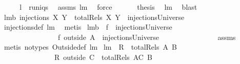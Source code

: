 \begin{isabellebody}
\ \ \isamarkupfalse%
\ \isamarkupfalse%
\ {\isachardoublequoteopen}{\isacharquery}l\ {\isasymsubseteq}\ runiqs{\isachardoublequoteclose}\ \isamarkupfalse%
\ assms{\isacharparenleft}{}{\isacharcomma}{}{\isacharparenright}\ lm{}{}\ \isamarkupfalse%
\ force\ \isanewline
\ \ \isamarkupfalse%
\ \isamarkupfalse%
\ {\isacharquery}thesis\ \isamarkupfalse%
\ lm{}{}\ \isamarkupfalse%
\ blast\isanewline
{}\isamarkupfalse%
%
\endisatagproof
{\isafoldproof}%
%
\isadelimproof
\isanewline
%
\endisadelimproof
\isanewline
{}\isamarkupfalse%
\ lm{}{}b{\isacharcolon}\ {\isachardoublequoteopen}injections\ X\ Y\ {\isacharequal}\ totalRels\ X\ Y\ {\isasyminter}\ injectionsUniverse{\isachardoublequoteclose}\ \isanewline
%
\isadelimproof
\ \ \ \ \ \ \ \ \ \ \ \ \ %
\endisadelimproof
%
\isatagproof
{}\isamarkupfalse%
\ injections{\isacharunderscore}def\ lm{}{}\ \isamarkupfalse%
\ metis%
\endisatagproof
{\isafoldproof}%
%
\isadelimproof
\isanewline
%
\endisadelimproof
\isanewline
{}\isamarkupfalse%
\ lm{}{}b{\isacharcolon}\ \ {\isachardoublequoteopen}f\ {\isasymin}\ injectionsUniverse{\isachardoublequoteclose}\ \isanewline
\ \ \ \ \ \ \ \ \ \ \ \ \ \ \ \ {\isachardoublequoteopen}f\ outside\ A\ {\isasymin}\ injectionsUniverse{\isachardoublequoteclose}\ \isanewline
%
\isadelimproof
\ \ \ \ \ \ \ \ \ \ \ \ \ %
\endisadelimproof
%
\isatagproof
{}\isamarkupfalse%
\ assms\ \isamarkupfalse%
\ {\isacharparenleft}metis\ {\isacharparenleft}no{\isacharunderscore}types{\isacharparenright}\ Outside{\isacharunderscore}def\ lm{}{}{\isacharparenright}%
\endisatagproof
{\isafoldproof}%
%
\isadelimproof
\isanewline
%
\endisadelimproof
\isanewline
{}\isamarkupfalse%
\ lm{}{}{\isacharcolon}\ \ {\isachardoublequoteopen}R\ {\isasymin}\ totalRels\ A\ B{\isachardoublequoteclose}\ \isanewline
\ \ \ \ \ \ \ \ \ \ \ \ \ \ \ {\isachardoublequoteopen}R\ outside\ C\ {\isasymin}\ totalRels\ {\isacharparenleft}A{\isacharminus}C{\isacharparenright}\ B{\isachardoublequoteclose}\ \isanewline
%
\isadelimproof
\ \ \ \ \ \ \ \ \ \ \ \ %
\endisadelimproof
%
\isatagproof
{}\isamarkupfalse%

\end{isabellebody}
